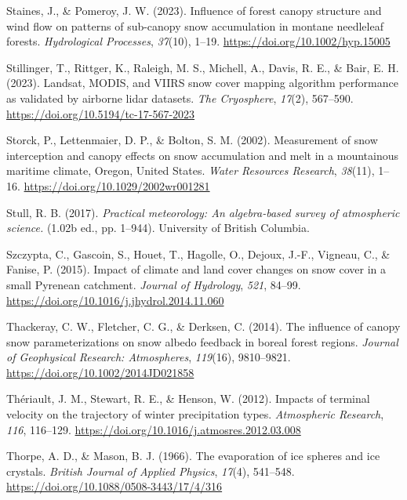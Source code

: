 \documentclass[
  letterpaper,
]{tex/uofsthesis-cs}
\newlength{\cslhangindent}
\newenvironment{CSLReferences}[2] %
 {\begin{list}{}{%
  \setlength{\itemindent}{0pt}
  \setlength{\leftmargin}{0pt}
  \setlength{\parsep}{0pt}
  \ifodd #1
   \setlength{\leftmargin}{\cslhangindent}
   \setlength{\itemindent}{-1\cslhangindent}
  \fi
  \setlength{\itemsep}{#2\baselineskip}}}
 {\end{list}}
\begin{document}
\begin{CSLReferences}{1}{0}
Staines, J., \& Pomeroy, J. W. (2023). Influence of forest canopy
structure and wind flow on patterns of sub-canopy snow accumulation in
montane needleleaf forests. \emph{Hydrological Processes},
\emph{37}(10), 1--19. \url{https://doi.org/10.1002/hyp.15005}

Stillinger, T., Rittger, K., Raleigh, M. S., Michell, A., Davis, R. E.,
\& Bair, E. H. (2023). Landsat, {MODIS}, and {VIIRS} snow cover mapping
algorithm performance as validated by airborne lidar datasets. \emph{The
Cryosphere}, \emph{17}(2), 567--590.
\url{https://doi.org/10.5194/tc-17-567-2023}

Storck, P., Lettenmaier, D. P., \& Bolton, S. M. (2002). Measurement of
snow interception and canopy effects on snow accumulation and melt in a
mountainous maritime climate, {Oregon}, {United States}. \emph{Water
Resources Research}, \emph{38}(11), 1--16.
\url{https://doi.org/10.1029/2002wr001281}

Stull, R. B. (2017). \emph{Practical meteorology: {An} algebra-based
survey of atmospheric science.} (1.02b ed., pp. 1--944). University of
British Columbia.

Szczypta, C., Gascoin, S., Houet, T., Hagolle, O., Dejoux, J.-F.,
Vigneau, C., \& Fanise, P. (2015). Impact of climate and land cover
changes on snow cover in a small {Pyrenean} catchment. \emph{Journal of
Hydrology}, \emph{521}, 84--99.
\url{https://doi.org/10.1016/j.jhydrol.2014.11.060}

Thackeray, C. W., Fletcher, C. G., \& Derksen, C. (2014). The influence
of canopy snow parameterizations on snow albedo feedback in boreal
forest regions. \emph{Journal of Geophysical Research: Atmospheres},
\emph{119}(16), 9810--9821. \url{https://doi.org/10.1002/2014JD021858}

Thériault, J. M., Stewart, R. E., \& Henson, W. (2012). Impacts of
terminal velocity on the trajectory of winter precipitation types.
\emph{Atmospheric Research}, \emph{116}, 116--129.
\url{https://doi.org/10.1016/j.atmosres.2012.03.008}

Thorpe, A. D., \& Mason, B. J. (1966). The evaporation of ice spheres
and ice crystals. \emph{British Journal of Applied Physics},
\emph{17}(4), 541--548. \url{https://doi.org/10.1088/0508-3443/17/4/316}


\end{CSLReferences}
\end{document}
